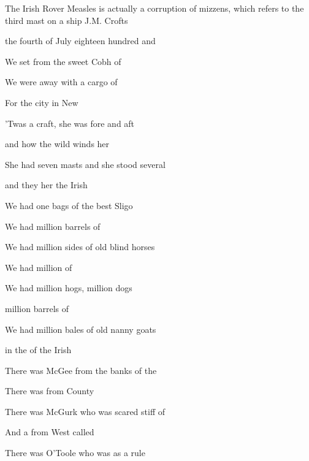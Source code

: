 \begin{SBSong}{The Irish Rover}
  {Measles is actually a corruption of mizzens, which refers to the third mast on a ship}
  {J.M. Crofts}
  \begin{SBVerse}
     the fourth of July eighteen hundred and 

    We set  from the sweet Cobh of 

    We were  away with a cargo of  

    For the  city  in New 

    'Twas a  craft, she was  fore and aft 

    and  how the wild winds  her 

    She had  seven masts and she stood several  

    and they  her the Irish 
  \end{SBVerse}
  \begin{SBVerse}
    We had one  bags of the best Sligo 

    We had  million barrels of 

    We had  million sides of old blind horses 

    We had  million  of 

    We had  million hogs,  million dogs

     million barrels of 

    We had  million bales of old nanny goats 

    in the  of the Irish 
  \end{SBVerse}
  \begin{SBVerse}
    There was  McGee from the banks of the 

    There was  from County 

    There was  McGurk who was scared stiff of 

    And a  from West called 

    There was  O'Toole who was  as a rule


\end{SBVerse}
\end{SBSong}
